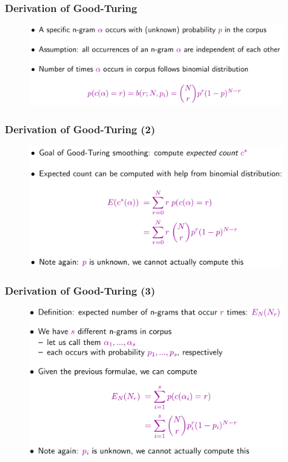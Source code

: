 \documentclass{beamer}
\begin{document}
\begin{frame}\frametitle{Derivation of Good-Turing}
\begin{figure}
\includegraphics[width=0.9\linewidth]{figure/derivation_good_turing.pdf}
\end{figure}
\end{frame}


\begin{frame}\frametitle{Derivation of Good-Turing (2)}
\begin{figure}
\includegraphics[width=0.9\linewidth]{figure/derivation_good_turing_2.pdf}
\end{figure}
\end{frame}


\begin{frame}\frametitle{Derivation of Good-Turing (3)}
\begin{figure}
\includegraphics[width=0.9\linewidth]{figure/derivation_good_turing_3.pdf}
\end{figure}
\end{frame}
\end{document}
